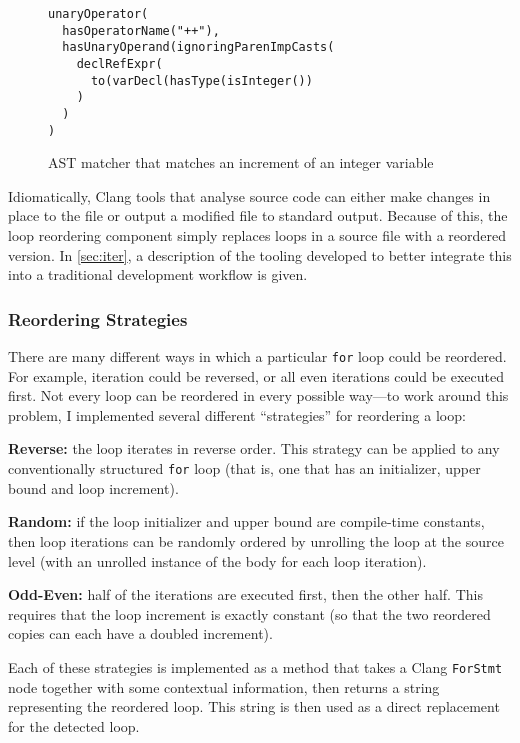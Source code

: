 \documentclass[journal]{IEEEtran}
\begin{document}
\begin{figure}[h]
  \centering
  \begin{lstlisting}
unaryOperator(
  hasOperatorName("++"),
  hasUnaryOperand(ignoringParenImpCasts(
    declRefExpr(
      to(varDecl(hasType(isInteger())
    )
  )
)
  \end{lstlisting}
  \caption{AST matcher that matches an increment of an integer variable}
  \label{lst:astm}
\end{figure}

Idiomatically, Clang tools that analyse source code can either make changes in
place to the file or output a modified file to standard output. Because of this,
the loop reordering component simply replaces loops in a source file with a
reordered version. In \autoref{sec:iter}, a description of the tooling developed
to better integrate this into a traditional development workflow is given.

\subsubsection{Reordering Strategies}

There are many different ways in which a particular \texttt{for} loop could be
reordered. For example, iteration could be reversed, or all even iterations
could be executed first. Not every loop can be reordered in every possible
way---to work around this problem, I implemented several different
``strategies'' for reordering a loop:

\textbf{Reverse:} the loop iterates in reverse order. This strategy can be
applied to any conventionally structured \texttt{for} loop (that is, one that
has an initializer, upper bound and loop increment).

\textbf{Random:} if the loop initializer and upper bound are compile-time
constants, then loop iterations can be randomly ordered by unrolling the loop at
the source level (with an unrolled instance of the body for each loop
iteration).

\textbf{Odd-Even:} half of the iterations are executed first, then the other
half. This requires that the loop increment is exactly constant (so that the two
reordered copies can each have a doubled increment).

Each of these strategies is implemented as a method that takes a Clang
\texttt{ForStmt} node together with some contextual information, then returns a
string representing the reordered loop. This string is then used as a direct
replacement for the detected loop.
\end{document}
